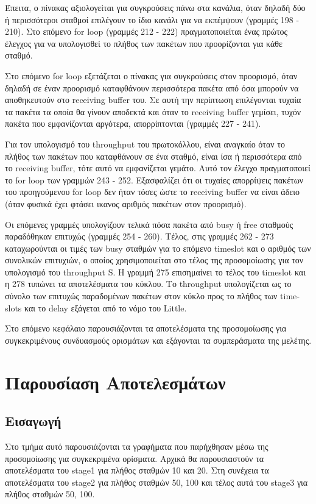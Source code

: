 \documentclass[12pt]{report}
\begin{document}
Έπειτα, ο πίνακας αξιολογείται για συγκρούσεις πάνω στα κανάλια, όταν δηλαδή δύο ή περισσότεροι σταθμοί επιλέγουν το ίδιο κανάλι για να εκπέμψουν (γραμμές 198 - 210). Στο επόμενο \textlatin{for loop} (γραμμές 212 - 222) πραγματοποιείται ένας πρώτος έλεγχος για να υπολογισθεί το πλήθος των πακέτων που προορίζονται για κάθε σταθμό.

Στο επόμενο \textlatin{for loop} εξετάζεται ο πίνακας για συγκρούσεις στον προορισμό, όταν δηλαδή σε έναν προορισμό καταφθάνουν περισσότερα πακέτα από όσα μπορούν να αποθηκευτούν στο \textlatin{receiving buffer} του. Σε αυτή την περίπτωση επιλέγονται τυχαία τα πακέτα τα οποία θα γίνουν αποδεκτά και όταν το \textlatin{receiving buffer} γεμίσει, τυχόν πακέτα που εμφανίζονται αργότερα, απορρίπτονται (γραμμές 227 - 241).

Για τον υπολογισμό του \textlatin{throughput} του πρωτοκόλλου, είναι αναγκαίο όταν το πλήθος των πακέτων που καταφθάνουν σε ένα σταθμό, είναι ίσα ή περισσότερα από το \textlatin{receiving buffer}, τότε αυτό να εμφανίζεται γεμάτο. Αυτό τον έλεγχο πραγματοποιεί το \textlatin{for loop} των γραμμών 243 - 252. Εξασφαλίζει ότι οι τυχαίες απορρίψεις πακέτων του προηγούμενου \textlatin{for loop} δεν ήταν τόσες ώστε το \textlatin{receiving buffer} να είναι άδειο (όταν φυσικά έχει φτάσει ικανος αριθμός πακέτων στον προορισμό).

Οι επόμενες γραμμές υπολογίζουν τελικά πόσα πακέτα από \textlatin{busy} ή \textlatin{free} σταθμούς παραδόθηκαν επιτυχώς (γραμμές 254 - 260). Τέλος, στις γραμμές 262 - 273 καταχωρούνται οι τιμές των \textlatin{busy} σταθμών για το επόμενο \textlatin{timeslot} και ο αριθμός των συνολικών επιτυχιών, ο οποίος χρησιμοποιείται στο τέλος της προσομοίωσης για τον υπολογισμό του \textlatin{throughput S}. Η γραμμή 275 επισημαίνει το τέλος του \textlatin{timeslot} και η 278 τυπώνει τα αποτελέσματα του κύκλου. Το \textlatin{throughput} υπολογίζεται ως το σύνολο των επιτυχώς παραδομένων πακέτων στον κύκλο προς το πλήθος των \textlatin{timeslots} και το \textlatin{delay} εξάγεται από το νόμο του \textlatin{Little}.

Στο επόμενο κεφάλαιο παρουσιάζονται τα αποτελέσματα της προσομοίωσης για συγκεκριμένους συνδυασμούς ορισμάτων και εξάγονται τα συμπεράσματα της μελέτης.

\chapter{Παρουσίαση Αποτελεσμάτων}\label{ch4}

\section{Εισαγωγή}
Στο τμήμα αυτό παρουσιάζονται τα γραφήματα που παρήχθησαν μέσω της προσομοίωσης για συγκεκριμένα ορίσματα. Αρχικά θα παρουσιαστούν τα αποτελέσματα του \textlatin{stage1} για πλήθος σταθμών 10 και 20. Στη συνέχεια τα αποτελέσματα του \textlatin{stage2} για πλήθος σταθμών 50, 100 και τέλος αυτά του \textlatin{stage3} για πλήθος σταθμών 50, 100.
\end{document}
